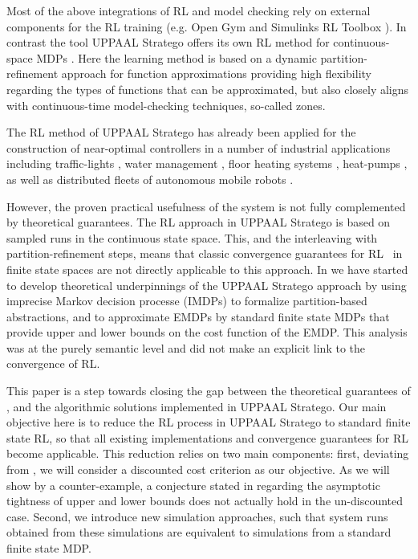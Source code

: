 \documentclass{llncs}
\begin{document}
Most of the above integrations of RL and model checking rely on external components for the RL training (e.g. Open Gym \cite{COOLMC} and Simulinks RL Toolbox \cite{HerberAL21}).  In contrast the tool UPPAAL Stratego offers its own RL method for continuous-space MDPs \cite{ATVA19}.  Here the learning method is based on a dynamic partition-refinement approach for function approximations providing high flexibility regarding the types of functions that can be approximated, but also closely aligns with continuous-time model-checking techniques, so-called zones. 

The RL method of UPPAAL Stratego has already been applied for the construction of near-optimal controllers in a number of industrial applications including traffic-lights \cite{TRP48}, water management \cite{ADHS21,ATVA22}, floor heating systems \cite{TACAS16}, heat-pumps \cite{TASE22}, as well as distributed fleets of autonomous mobile robots \cite{ICAPS22}.

However, the proven practical usefulness of the system is not fully complemented by theoretical guarantees.
The RL approach in UPPAAL Stratego is based on sampled runs in the continuous state space. This, and the
interleaving with partition-refinement steps, means that classic convergence guarantees for
RL~\cite{jaakkola1993convergence}
in finite state spaces are not directly applicable to this approach. 
In \cite{jaeger2020approximating} we have started to develop theoretical underpinnings of the UPPAAL Stratego
approach by using imprecise Markov decision processe (IMDPs) to  formalize 
partition-based abstractions, and
to approximate EMDPs by standard finite state MDPs that provide upper and lower bounds on the
cost function of the EMDP. This analysis was at the purely semantic level and did not make an explicit
link to the convergence of RL. 

This paper is a step towards closing the gap between the theoretical guarantees of \cite{jaeger2020approximating},
and the algorithmic solutions implemented in UPPAAL Stratego. Our main objective here is to reduce the
RL process in UPPAAL Stratego to standard finite state RL, so that all existing implementations and
convergence guarantees for RL become applicable. This reduction relies on two main components: first,
deviating from \cite{jaeger2020approximating}, we will consider a discounted cost criterion as our objective.
As we will show by a counter-example, a conjecture stated in \cite{jaeger2020approximating} regarding the
asymptotic tightness of upper and lower bounds does not actually hold in the un-discounted case. Second, we
introduce new simulation approaches, such that system runs obtained from these simulations are equivalent
to simulations from a standard finite state MDP. 
\end{document}
